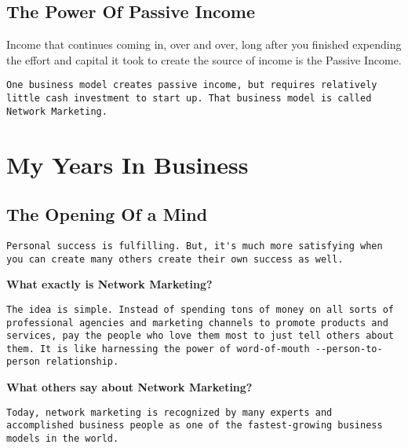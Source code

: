 \documentclass[a4paper, 12pt]{report}
\begin{document}
    \section{The Power Of Passive Income}
    Income that continues coming in, over and over, long after you finished expending the effort and capital it took to create the source of income is the Passive Income.
    
    \begin{lstlisting}[style=latexFrameTB]
               One business model creates passive income, but requires relatively little cash investment to start up. That business model is called Network Marketing.
    \end{lstlisting}
    \chapter{My Years In Business}
    \section{The Opening Of a Mind}
     \begin{lstlisting}[style=latexFrameTB]
               Personal success is fulfilling. But, it's much more satisfying when you can create many others create their own success as well.
    \end{lstlisting}
    
    \begin{framedquest*}
       \textbf{What exactly is Network Marketing?}
    \end{framedquest*}
    \begin{lstlisting}[style=latexFrameTB]
               The idea is simple. Instead of spending tons of money on all sorts of professional agencies and marketing channels to promote products and services, pay the people who love them most to just tell others about them. It is like harnessing the power of word-of-mouth --person-to-person relationship.
    \end{lstlisting}
    
    \begin{framedquest*}
       \textbf{What others say about Network Marketing?}
    \end{framedquest*}
    \begin{lstlisting}[style=latexFrameTB]
               Today, network marketing is recognized by many experts and accomplished business people as one of the fastest-growing business models in the world.
    \end{lstlisting}
\end{document}

